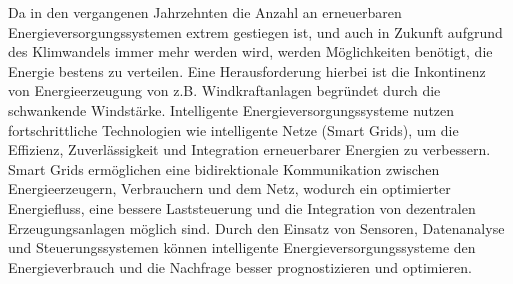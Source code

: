 Da in den vergangenen Jahrzehnten die Anzahl an erneuerbaren
Energieversorgungssystemen extrem gestiegen ist, und auch in Zukunft aufgrund
des Klimwandels immer mehr werden wird, werden Möglichkeiten benötigt, die
Energie bestens zu verteilen. Eine Herausforderung hierbei ist die Inkontinenz
von Energieerzeugung von z.B. Windkraftanlagen begründet durch die schwankende
Windstärke. Intelligente Energieversorgungssysteme nutzen fortschrittliche
Technologien wie intelligente Netze (Smart Grids), um die Effizienz,
Zuverlässigkeit und Integration erneuerbarer Energien zu verbessern. Smart
Grids ermöglichen eine bidirektionale Kommunikation zwischen Energieerzeugern,
Verbrauchern und dem Netz, wodurch ein optimierter Energiefluss, eine bessere
Laststeuerung und die Integration von dezentralen Erzeugungsanlagen möglich
sind.\cite{lund2012electricity} Durch den Einsatz von Sensoren, Datenanalyse und Steuerungssystemen
können intelligente Energieversorgungssysteme den Energieverbrauch und die
Nachfrage besser prognostizieren und optimieren.